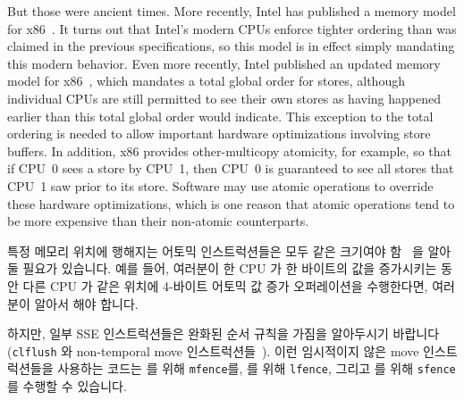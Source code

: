 But those were ancient times.
More recently, Intel has published a memory model for
x86~\cite{Intelx86MemoryOrdering2007}.
It turns out that Intel's modern CPUs enforce tighter ordering than
was claimed in the previous specifications, so this model is in effect
simply mandating this modern behavior.
Even more recently, Intel published an updated memory model for
x86~\cite[Section 8.2]{Intel64IA32v3A2011}, which mandates a total global order
for stores, although individual CPUs are still permitted to see their
own stores as having happened earlier than this total global order
would indicate.
This exception to the total ordering is needed to allow important
hardware optimizations involving store buffers.
In addition, x86 provides other-multicopy atomicity, for example,
so that if CPU~0 sees a store by CPU~1, then CPU~0 is guaranteed to see
all stores that CPU~1 saw prior to its store.
Software may use atomic operations to override these hardware optimizations,
which is one reason that atomic operations tend to be more expensive
than their non-atomic counterparts.
\fi

특정 메모리 위치에 행해지는 어토믹 인스트럭션들은 모두 같은 크기여야
함~\cite[Section 8.1.2.2]{Intel64IA32v3A2011} 을 알아둘 필요가 있습니다.
예를 들어, 여러분이 한 CPU 가 한 바이트의 값을 증가시키는 동안 다른 CPU 가 같은
위치에 4-바이트 어토믹 값 증가 오퍼레이션을 수행한다면, 여러분이 알아서 해야
합니다.

하지만, 일부 SSE 인스트럭션들은 완화된 순서 규칙을 가짐을 알아두시기 바랍니다
({\tt clflush} 와 non-temporal move 인스트럭션들~\cite{IntelXeonV2b-96a}).
이런 임시적이지 않은 move 인스트럭션들을 사용하는 코드는  를 위해
{\tt mfence}를,  를 위해 {\tt lfence}, 그리고  를
위해 {\tt sfence} 를 수행할 수 있습니다.

